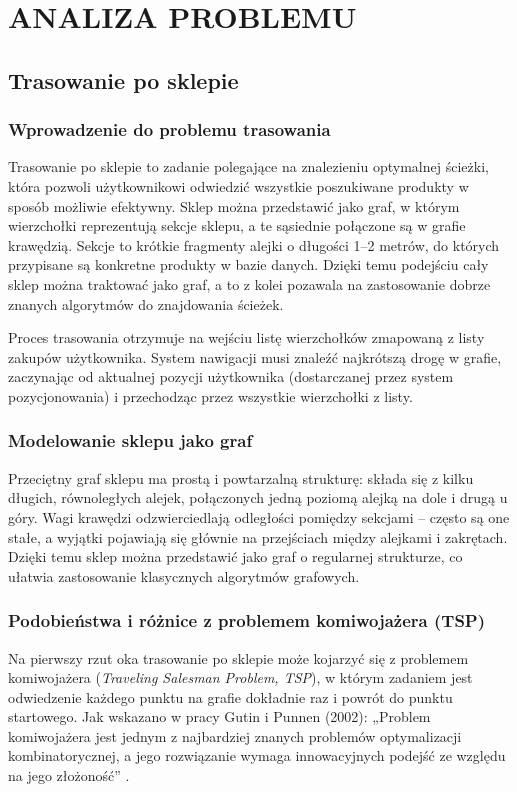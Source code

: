 \chapter{ANALIZA PROBLEMU}
\label{chapter:analiza_problemu}

\section{Trasowanie po sklepie}

\subsection{Wprowadzenie do problemu trasowania}

Trasowanie po sklepie to zadanie polegające na znalezieniu optymalnej ścieżki, która pozwoli użytkownikowi odwiedzić wszystkie poszukiwane produkty w sposób możliwie efektywny. Sklep można przedstawić jako graf, w którym wierzchołki reprezentują sekcje sklepu, a te sąsiednie połączone są w grafie krawędzią. Sekcje to krótkie fragmenty alejki o długości 1–2 metrów, do których przypisane są konkretne produkty w bazie danych. Dzięki temu podejściu cały sklep można traktować jako graf, a to z kolei pozawala na zastosowanie dobrze znanych algorytmów do znajdowania ścieżek.

Proces trasowania otrzymuje na wejściu listę wierzchołków zmapowaną z listy zakupów użytkownika. System nawigacji musi znaleźć najkrótszą drogę w grafie, zaczynając od aktualnej pozycji użytkownika (dostarczanej przez system pozycjonowania) i przechodząc przez wszystkie wierzchołki z listy.

\subsection{Modelowanie sklepu jako graf}
Przeciętny graf sklepu ma prostą i powtarzalną strukturę: składa się z kilku długich, równoległych alejek, połączonych jedną poziomą alejką na dole i drugą u góry. Wagi krawędzi odzwierciedlają odległości pomiędzy sekcjami – często są one stałe, a wyjątki pojawiają się głównie na przejściach między alejkami i zakrętach. Dzięki temu sklep można przedstawić jako graf o regularnej strukturze, co ułatwia zastosowanie klasycznych algorytmów grafowych.

\subsection{Podobieństwa i różnice z problemem komiwojażera (TSP)}
Na pierwszy rzut oka trasowanie po sklepie może kojarzyć się z problemem komiwojażera (\textit{Traveling Salesman Problem, TSP}), w którym zadaniem jest odwiedzenie każdego punktu na grafie dokładnie raz i powrót do punktu startowego. Jak wskazano w pracy Gutin i Punnen (2002): „Problem komiwojażera jest jednym z najbardziej znanych problemów optymalizacji kombinatorycznej, a jego rozwiązanie wymaga innowacyjnych podejść ze względu na jego złożoność” \cite{Gutin2002}.

